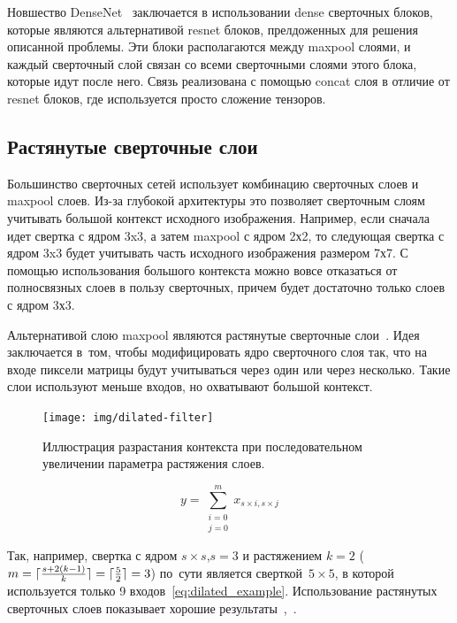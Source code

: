 Новшество DenseNet~\cite{densenet} заключается в использовании dense сверточных блоков, которые являются альтернативой resnet блоков\cite{resnet}, прелдоженных для решения описанной проблемы. Эти блоки располагаются между maxpool слоями, и каждый сверточный слой связан со всеми сверточными слоями этого блока, которые идут после него. Связь реализована с помощью concat слоя в отличие от resnet блоков, где используется просто сложение тензоров.   

\subsection{Растянутые сверточные слои}

Большинство сверточных сетей использует комбинацию сверточных слоев и maxpool слоев. Из-за глубокой архитектуры это позволяет сверточным слоям учитывать большой контекст исходного изображения. Например, если сначала идет свертка с ядром 3x3, а затем maxpool с ядром 2х2, то следующая свертка с ядром 3x3 будет учитывать часть исходного изображения размером 7х7. С помощью использования большого контекста можно вовсе отказаться от полносвязных слоев в пользу сверточных, причем будет достаточно только слоев с ядром 3х3.

Альтернативой слою maxpool являются растянутые сверточные слои~\cite{dilated_conv}. 
Идея заключается в~том, чтобы модифицировать ядро сверточного слоя так, что на входе 
пиксели матрицы будут учитываться через один или через несколько. Такие слои используют 
меньше входов, но охватывают большой контекст. 

\newpage

\begin{figure}[hb]
  \texttt{[image: img/dilated-filter]}
  \caption{Иллюстрация разрастания контекста при последовательном увеличении параметра растяжения слоев.}
\end{figure}

\begin{equation}
\label{eq:dilated_example}
y = \sum_{
  \substack{
    i=0 \\
    j=0
  }
}^{m}x_{s\times{}i,s\times{}j}
\end{equation}

\newcommand{\kernel}[1]{$#1\times{}#1$}

\DeclarePairedDelimiter\ceil{\lceil}{\rceil}
\DeclarePairedDelimiter\floor{\lfloor}{\rfloor}

Так, например, свертка с ядром \kernel{s},$s=3$ и растяжением $k=2$ 
\mbox{($m=\ceil{\frac{s+2(k-1)}{k}}=\ceil{\frac{5}{2}}=3$)} по~сути является 
сверткой~\kernel{5}, в которой используется только 9 входов~\eqref{eq:dilated_example}. Использование растянутых сверточных слоев показывает хорошие результаты~\cite{segm_dcnn_crf},~\cite{deeplab}.

